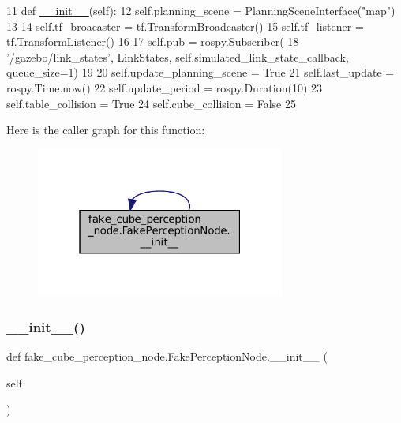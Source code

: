 \begin{DoxyCode}
11     \textcolor{keyword}{def }\hyperlink{classfake__cube__perception__node_1_1FakePerceptionNode_a6f5d90816c2222cf76bd632b5ad46457}{\_\_init\_\_}(self):
12         self.planning\_scene = PlanningSceneInterface(\textcolor{stringliteral}{"map"})
13 
14         self.tf\_broacaster = tf.TransformBroadcaster()
15         self.tf\_listener = tf.TransformListener()
16 
17         self.pub = rospy.Subscriber(
18             \textcolor{stringliteral}{'/gazebo/link\_states'}, LinkStates, self.simulated\_link\_state\_callback, queue\_size=1)
19 
20         self.update\_planning\_scene = \textcolor{keyword}{True}
21         self.last\_update = rospy.Time.now()
22         self.update\_period = rospy.Duration(10)
23         self.table\_collision = \textcolor{keyword}{True}
24         self.cube\_collision = \textcolor{keyword}{False}
25 
\end{DoxyCode}
Here is the caller graph for this function\+:
\nopagebreak
\begin{figure}[H]
\begin{center}
\leavevmode
\includegraphics[width=232pt]{classfake__cube__perception__node_1_1FakePerceptionNode_a6f5d90816c2222cf76bd632b5ad46457_icgraph}
\end{center}
\end{figure}
\mbox{\label{classfake__cube__perception__node_1_1FakePerceptionNode_a6f5d90816c2222cf76bd632b5ad46457}} 
\subsubsection{\texorpdfstring{\+\_\+\+\_\+init\+\_\+\+\_\+()}{\_\_init\_\_()}\hspace{0.1cm}{\footnotesize\ttfamily [2/2]}}
{\footnotesize\ttfamily def fake\+\_\+cube\+\_\+perception\+\_\+node.\+Fake\+Perception\+Node.\+\_\+\+\_\+init\+\_\+\+\_\+ (\begin{DoxyParamCaption}\item[{}]{self }\end{DoxyParamCaption})}



